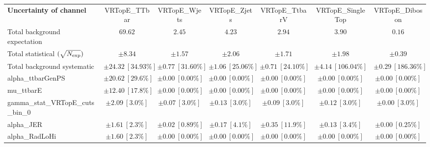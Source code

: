 
\begin{sidewaystable}
\begin{center}
\setlength{\tabcolsep}{0.0pc}
\begin{tabular*}{\textwidth}{@{\extracolsep{\fill}}lcccccc}
\noalign{\smallskip}\hline\noalign{\smallskip}
{\bf Uncertainty of channel}                                    & VRTopE\_TTbar            & VRTopE\_Wjets            & VRTopE\_Zjets            & VRTopE\_TtbarV            & VRTopE\_SingleTop            & VRTopE\_Diboson            \\
\noalign{\smallskip}\hline\noalign{\smallskip}
Total background expectation             &  $69.62$        &  $2.45$        &  $4.23$        &  $2.94$        &  $3.90$        &  $0.16$       \\
\noalign{\smallskip}\hline\noalign{\smallskip}
Total statistical $(\sqrt{N_{\rm exp}})$              & $\pm 8.34$        & $\pm 1.57$        & $\pm 2.06$        & $\pm 1.71$        & $\pm 1.98$        & $\pm 0.39$       \\
Total background systematic               & $\pm 24.32\ [34.93\%] $        & $\pm 0.77\ [31.60\%] $        & $\pm 1.06\ [25.06\%] $        & $\pm 0.71\ [24.10\%] $        & $\pm 4.14\ [106.04\%] $        & $\pm 0.29\ [186.36\%] $             \\
\noalign{\smallskip}\hline\noalign{\smallskip}
\noalign{\smallskip}\hline\noalign{\smallskip}
alpha\_ttbarGenPS         & $\pm 20.62\ [29.6\%] $          & $\pm 0.00\ [0.00\%] $          & $\pm 0.00\ [0.00\%] $          & $\pm 0.00\ [0.00\%] $          & $\pm 0.00\ [0.00\%] $          & $\pm 0.00\ [0.00\%] $       \\
mu\_ttbarE         & $\pm 12.40\ [17.8\%] $          & $\pm 0.00\ [0.00\%] $          & $\pm 0.00\ [0.00\%] $          & $\pm 0.00\ [0.00\%] $          & $\pm 0.00\ [0.00\%] $          & $\pm 0.00\ [0.00\%] $       \\
gamma\_stat\_VRTopE\_cuts\_bin\_0         & $\pm 2.09\ [3.0\%] $          & $\pm 0.07\ [3.0\%] $          & $\pm 0.13\ [3.0\%] $          & $\pm 0.09\ [3.0\%] $          & $\pm 0.12\ [3.0\%] $          & $\pm 0.00\ [3.0\%] $       \\
alpha\_JER         & $\pm 1.61\ [2.3\%] $          & $\pm 0.02\ [0.89\%] $          & $\pm 0.17\ [4.1\%] $          & $\pm 0.35\ [11.9\%] $          & $\pm 0.13\ [3.4\%] $          & $\pm 0.00\ [0.25\%] $       \\
alpha\_RadLoHi         & $\pm 1.60\ [2.3\%] $          & $\pm 0.00\ [0.00\%] $          & $\pm 0.00\ [0.00\%] $          & $\pm 0.00\ [0.00\%] $          & $\pm 0.00\ [0.00\%] $          & $\pm 0.00\ [0.00\%] $       \\

\end{tabular*}
\end{center}
\end{sidewaystable}

